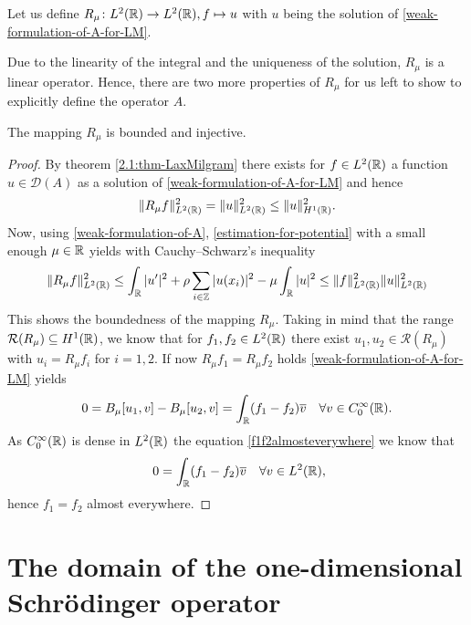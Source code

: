 \begin{definition}
	Let us define $R_{\mu} \colon L^{2}(\mathbb{R}) \rightarrow L^{2}(\mathbb{R}), f \mapsto u$ with $u$ being the solution of \eqref{weak-formulation-of-A-for-LM}.
\end{definition}
Due to the linearity of the integral and the uniqueness of the solution, $R_{\mu}$ is a linear operator. Hence, there are two more properties of $R_{\mu}$ for us left to show to explicitly define the operator $A$. 
\begin{theorem} \label{rmuinj}
	The mapping $R_{\mu}$ is bounded and injective.
	
	\begin{proof}
		By theorem \ref{2.1:thm-LaxMilgram} there exists for $f \in L^{2}(\mathbb{R})$ a function $u \in \mathcal{D}(A)$ as a solution of \eqref{weak-formulation-of-A-for-LM} and hence
		\[ \| R_{\mu} f \|_{L^{2}(\mathbb{R})}^{2} = \| u \|_{L^{2}(\mathbb{R})}^{2} \leq \| u \|_{H^{1}(\mathbb{R})}^{2}. \] 
		Now, using \eqref{weak-formulation-of-A}, \eqref{estimation-for-potential} with a small enough $\mu \in \mathbb{R}$ yields with Cauchy–Schwarz's inequality
		\[ \| R_{\mu} f \|_{L^{2}(\mathbb{R})}^{2} \leq \int_{\mathbb{R}} |u'|^{2} + \rho \sum_{i \in \mathbb{Z}} |u(x_{i})|^{2} - \mu \int_{\mathbb{R}} |u|^{2} \leq \| f \|_{L^{2}(\mathbb{R})}^{2} \| u \|_{L^{2}(\mathbb{R})}^{2} \]	
		This shows the boundedness of the mapping $R_{\mu}$. Taking in mind that the range $\mathcal{R}(R_{\mu}) \subseteq H^{1}(\mathbb{R})$, we know that for $f_{1}, f_{2} \in L^{2}(\mathbb{R})$ there exist  $u_{1}, u_{2} \in \mathcal{R}(R_{\mu})$ with $u_{i} = R_{\mu} f_{i}$ for $i = 1, 2$. If now $R_{\mu} f_{1} = R_{\mu} f_{2}$ holds \eqref{weak-formulation-of-A-for-LM} yields
		\begin{equation}
			0 = B_{\mu}[u_{1}, v] - B_{\mu}[u_{2}, v] = \int_{\mathbb{R}} (f_{1} - f_{2}) \overline{v} \quad \forall v \in C_{0}^{\infty}(\mathbb{R}). \label{f1f2almosteverywhere}
		\end{equation} 
		As $C_{0}^{\infty}(\mathbb{R})$ is dense in $L^{2}(\mathbb{R})$ the equation \eqref{f1f2almosteverywhere} we know that
		\[ 0 = \int_{\R} (f_{1} - f_{2}) \overline{v} \quad \forall v \in L^{2}(\R),  \]
		hence $f_{1} = f_{2}$ almost everywhere.
	\end{proof}
\end{theorem}

\section{The domain of the one-dimensional Schrödinger operator} \label{chap-2.2}


